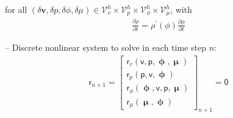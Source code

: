 \documentclass[a4paper,12pt]{report}
\newcommand{\bs}[1]{\boldsymbol{#1}}
\newcommand{\ROP}{\bs{\mathsf{r}}}
\begin{document}
for all $(\delta\boldsymbol{v},\delta p,\delta\phi,\delta\mu) \in \boldsymbol{\mathcal{V}}_{v}^{h} \times \mathcal{V}_{p}^{h} \times \mathcal{V}_{\phi}^{h} \times \mathcal{V}_{\mu}^{h}$, with
\begin{align}
\frac{\partial\rho}{\partial t} = \rho^{\prime}(\phi)\frac{\partial\phi}{\partial t}
\end{align}

-- Discrete nonlinear system to solve in each time step $n$:
\begin{equation}
\label{equation-nonlin-sys-multiphase}
\begin{aligned}
\ROP_{n+1} = \begin{bmatrix} \ROP_{v}(\boldsymbol{\mathsf{v}},\boldsymbol{\mathsf{p}},\boldsymbol{\upphi},\boldsymbol{\upmu}) \\ \ROP_{p}(\boldsymbol{\mathsf{p}},\boldsymbol{\mathsf{v}},\boldsymbol{\upphi}) \\ \ROP_{\phi}(\boldsymbol{\upphi},\boldsymbol{\mathsf{v}},\boldsymbol{\mathsf{p}},\boldsymbol{\upmu}) \\ \ROP_{\mu}(\boldsymbol{\upmu},\boldsymbol{\upphi}) \end{bmatrix}_{n+1} = \boldsymbol{\mathsf{0}}
\end{aligned}
\end{equation}
\end{document}
